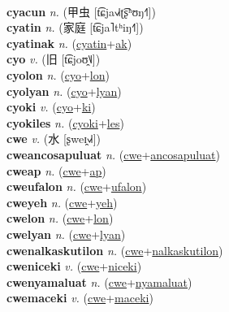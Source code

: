  \label{cyaukipowiki} \\
\textbf{cyacun} \textit{n.} ({\chinese{}甲虫} [t͡ɕja˧˩˧ʈ͡ʂʰʊŋ˧˥])
 \label{cyacun} \\
\textbf{cyatin} \textit{n.} ({\chinese{}家庭} [t͡ɕja˥tʰiŋ˧˥])
 \label{cyatin} \\
\textbf{cyatinak} \textit{n.} (\hyperref[cyatin]{cyatin}+\hyperref[ak]{ak})
 \label{cyatinak} \\
\textbf{cyo} \textit{v.} ({\chinese{}旧} [t͡ɕjoʊ̯˥˩])
 \label{cyo} \\
\textbf{cyolon} \textit{n.} (\hyperref[cyo]{cyo}+\hyperref[lon]{lon})
 \label{cyolon} \\
\textbf{cyolyan} \textit{n.} (\hyperref[cyo]{cyo}+\hyperref[lyan]{lyan})
 \label{cyolyan} \\
\textbf{cyoki} \textit{v.} (\hyperref[cyo]{cyo}+\hyperref[ki]{ki})
 \label{cyoki} \\
\textbf{cyokiles} \textit{n.} (\hyperref[cyoki]{cyoki}+\hyperref[les]{les})
 \label{cyokiles} \\
\textbf{cwe} \textit{v.} ({\chinese{}水} [ʂweɪ̯˧˩˧])
 \label{cwe} \\
\textbf{cweancosapuluat} \textit{n.} (\hyperref[cwe]{cwe}+\hyperref[ancosapuluat]{ancosapuluat})
 \label{cweancosapuluat} \\
\textbf{cweap} \textit{n.} (\hyperref[cwe]{cwe}+\hyperref[ap]{ap})
 \label{cweap} \\
\textbf{cweufalon} \textit{n.} (\hyperref[cwe]{cwe}+\hyperref[ufalon]{ufalon})
 \label{cweufalon} \\
\textbf{cweyeh} \textit{n.} (\hyperref[cwe]{cwe}+\hyperref[yeh]{yeh})
 \label{cweyeh} \\
\textbf{cwelon} \textit{n.} (\hyperref[cwe]{cwe}+\hyperref[lon]{lon})
 \label{cwelon} \\
\textbf{cwelyan} \textit{n.} (\hyperref[cwe]{cwe}+\hyperref[lyan]{lyan})
 \label{cwelyan} \\
\textbf{cwenalkaskutilon} \textit{n.} (\hyperref[cwe]{cwe}+\hyperref[nalkaskutilon]{nalkaskutilon})
 \label{cwenalkaskutilon} \\
\textbf{cweniceki} \textit{v.} (\hyperref[cwe]{cwe}+\hyperref[niceki]{niceki})
 \label{cweniceki} \\
\textbf{cwenyamaluat} \textit{n.} (\hyperref[cwe]{cwe}+\hyperref[nyamaluat]{nyamaluat})
 \label{cwenyamaluat} \\
\textbf{cwemaceki} \textit{v.} (\hyperref[cwe]{cwe}+\hyperref[maceki]{maceki})
 \label{cwemaceki} \\
